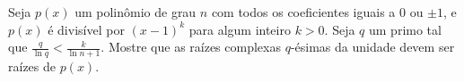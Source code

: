 Seja \(p(x)\) um polinômio de grau \(n\) com todos os coeficientes iguais a \(0\) ou \(\pm1\), e \(p(x)\) é divisível por \((x - 1)^k\) para algum inteiro \(k > 0\). Seja \(q\) um primo tal que \(\frac{q}{\ln q}< \frac{k}{\ln n+1}\). Mostre que as raízes complexas \(q\)-ésimas da unidade devem ser raízes de \(p(x)\).
